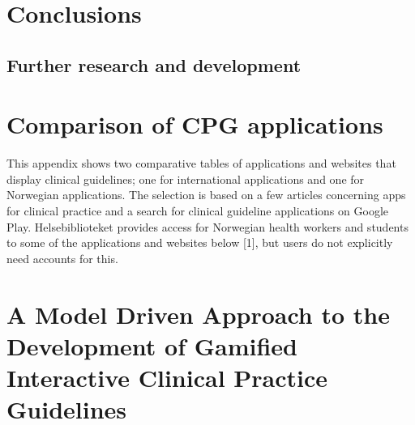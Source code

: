 \documentclass[a4paper,12pt,oneside]{book}
\begin{document}
\chapter{Conclusions}
\section{Further research and development}


\backmatter
\printbibliography


\appendix
\appendixpage
\addappheadtotoc
\chapter{Comparison of CPG applications}\label{appendix:ComparisonApps}
This appendix shows two comparative tables of applications and websites that display clinical guidelines; one for international applications and one for Norwegian applications. The selection is based on a few articles concerning apps for clinical practice and a search for clinical guideline applications on Google Play.
Helsebiblioteket provides access for Norwegian health workers and students to some of the applications and websites below [1], but users do not explicitly need accounts for this.


\chapter{A Model Driven Approach to the Development of Gamified Interactive Clinical
	Practice Guidelines}\label{appendix:Paper}

\end{document}
